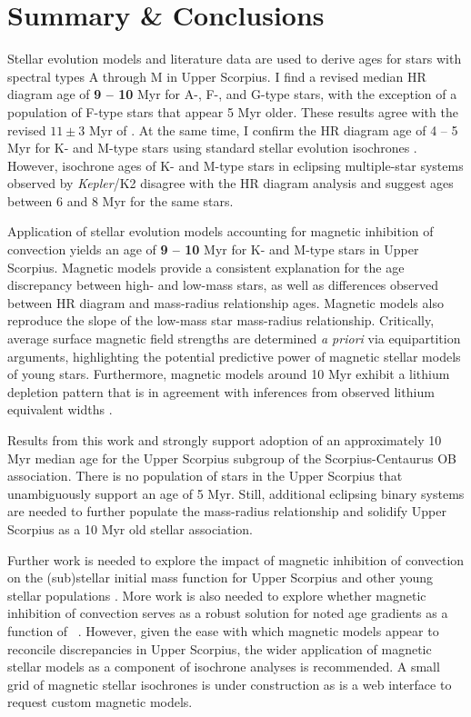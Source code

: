 \documentclass{aa}
\begin{document}
\section{Summary \& Conclusions}
\label{sec:tellit}
Stellar evolution models and literature data are used to derive ages for stars with spectral types A through M in Upper Scorpius. I find a revised median HR diagram age of {\bf 9 -- 10} Myr for A-, F-, and G-type stars, with the exception of a population of F-type stars that appear 5 Myr older. These results agree with the revised $11\pm3$ Myr of \citet{Pecaut2012}. At the same time, I confirm the HR diagram age of 4 -- 5 Myr for K- and M-type stars using standard stellar evolution isochrones \citep{Preibisch2012, Slesnick2008, Herczeg2015}. However, isochrone ages of K- and M-type stars in eclipsing multiple-star systems observed by \emph{Kepler}/K2 \citep{Kraus2015, Alonso2015} disagree with the HR diagram analysis and suggest ages between 6 and 8 Myr for the same stars.

Application of stellar evolution models accounting for magnetic inhibition of convection \citep{FC12b, FC13} yields an age of {\bf 9 -- 10} Myr for K- and M-type stars in Upper Scorpius. Magnetic models provide a consistent explanation for the age discrepancy between high- and low-mass stars, as well as differences observed between HR diagram and mass-radius relationship ages. Magnetic models also reproduce the slope of the low-mass star mass-radius relationship. Critically, average surface magnetic field strengths are determined \emph{a priori} via equipartition arguments, highlighting the potential predictive power of magnetic stellar models of young stars. Furthermore, magnetic models around 10 Myr exhibit a lithium depletion pattern that is in agreement with inferences from observed lithium equivalent widths \citep{Rizzuto2015}. 

Results from this work and \citet{Pecaut2012} strongly support adoption of an approximately 10 Myr median age for the Upper Scorpius subgroup of the Scorpius-Centaurus OB association. There is no population of stars in the Upper Scorpius that unambiguously support an age of 5 Myr. Still, additional eclipsing binary systems are needed to further populate the mass-radius relationship and solidify Upper Scorpius as a 10 Myr old stellar association. 

Further work is needed to explore the impact of magnetic inhibition of convection on the (sub)stellar initial mass function for Upper Scorpius and other young stellar populations \citep[e.g.,][]{Ardila2000, Preibisch2002}. More work is also needed to explore whether magnetic inhibition of convection serves as a robust solution for noted age gradients as a function of \teff\ \citep{Naylor2009, Herczeg2015}. However, given the ease with which magnetic models appear to reconcile discrepancies in Upper Scorpius, the wider application of magnetic stellar models as a component of isochrone analyses is recommended. A small grid of magnetic stellar isochrones is under construction as is a web interface to request custom magnetic models. 
\end{document}
